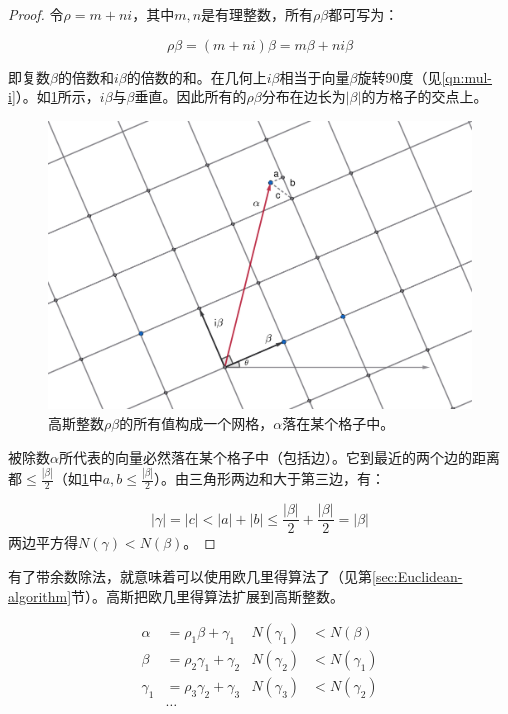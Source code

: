 \documentclass[b5paper]{ctexart}
\begin{document}
\begin{proof}
令$\rho = m + ni$，其中$m, n$是有理整数，所有$\rho \beta$都可写为：

\[
\rho \beta = (m + ni)\beta = m\beta + ni\beta
\]

即复数$\beta$的倍数和$i\beta$的倍数的和。在几何上$i\beta$相当于向量$\beta$旋转90度（见\cref{qn:mul-i}）。如\cref{fig:zi}所示，$i\beta$与$\beta$垂直。因此所有的$\rho \beta$分布在边长为$|\beta|$的方格子的交点上。

\begin{figure}[htbp]
 \centering
 \includegraphics[scale=0.3]{img/zi}
 \caption{高斯整数$\rho \beta$的所有值构成一个网格，$\alpha$落在某个格子中。}
 \label{fig:zi}
\end{figure}

被除数$\alpha$所代表的向量必然落在某个格子中（包括边）。它到最近的两个边的距离都$\leq \frac{|\beta|}{2}$（如\cref{fig:zi}中$a, b \leq \frac{|\beta|}{2}$）。由三角形两边和大于第三边，有：

\[
|\gamma| = |c| < |a| + |b| \leq \frac{|\beta|}{2} + \frac{|\beta|}{2} = |\beta|
\]
两边平方得$N(\gamma) < N(\beta)$。
\end{proof}

有了带余数除法，就意味着可以使用欧几里得算法了（见第\ref{sec:Euclidean-algorithm}节）。高斯把欧几里得算法扩展到高斯整数。

\begin{align*}
\alpha   &= \rho_1 \beta + \gamma_1    & N(\gamma_1) &< N(\beta) \\
\beta    &= \rho_2 \gamma_1 + \gamma_2 & N(\gamma_2) &< N(\gamma_1) \\
\gamma_1 &= \rho_3 \gamma_2 + \gamma_3 & N(\gamma_3) &< N(\gamma_2) \\
         & \dotso
\end{align*}
\end{document}
